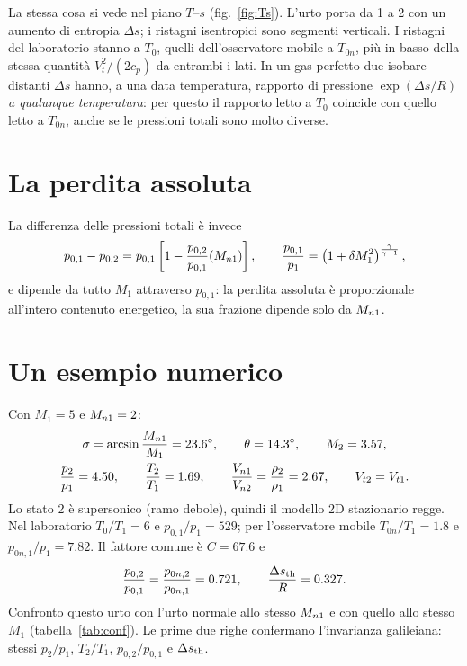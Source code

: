 La stessa cosa si vede nel piano $T$--$s$ (fig.~\ref{fig:Ts}). L'urto porta da 1 a 2 con un aumento di entropia
$\Delta s$; i ristagni isentropici sono segmenti verticali. I ristagni del laboratorio stanno a $T_0$, quelli
dell'osservatore mobile a $T_{0n}$, più in basso della stessa quantità $V_t^2/(2c_p)$ da entrambi i lati. In un gas
perfetto due isobare distanti $\Delta s$ hanno, a una data temperatura, rapporto di pressione $\exp(\Delta s/R)$
\emph{a qualunque temperatura}: per questo il rapporto letto a $T_0$ coincide con quello letto a $T_{0n}$, anche se
le pressioni totali sono molto diverse.


\section*{La perdita assoluta}
La differenza delle pressioni totali è invece
\begin{gather*}
  p_{0,1}-p_{0,2}=p_{0,1}\left[1-\frac{p_{0,2}}{p_{0,1}}(M_{n1})\right] ,\qquad
  \frac{p_{0,1}}{p_1}=\left(1+\delta M_1^2\right)^{\frac{\gamma}{\gamma-1}},
\end{gather*}
e dipende da tutto $M_1$ attraverso $p_{0,1}$: la perdita assoluta è proporzionale all'intero contenuto energetico,
la sua frazione dipende solo da $M_{n1}$.

\section*{Un esempio numerico}
Con $M_1=5$ e $M_{n1}=2$:
\begin{gather*}
  \sigma=\arcsin\frac{M_{n1}}{M_1}=\ang{23.6} ,\qquad \theta=\ang{14.3} ,\qquad M_2=\num{3.57},\\
  \frac{p_2}{p_1}=\num{4.50} ,\qquad \frac{T_2}{T_1}=\num{1.69} ,\qquad
  \frac{V_{n1}}{V_{n2}}=\frac{\rho_2}{\rho_1}=\num{2.67} ,\qquad V_{t2}=V_{t1}.
\end{gather*}
Lo stato 2 è supersonico (ramo debole), quindi il modello 2D stazionario regge. Nel laboratorio $T_0/T_1=6$ e
$p_{0,1}/p_1=529$; per l'osservatore mobile $T_{0n}/T_1=\num{1.8}$ e $p_{0n,1}/p_1=\num{7.82}$. Il fattore comune è
$C=\num{67.6}$ e
\begin{gather*}
  \frac{p_{0,2}}{p_{0,1}}=\frac{p_{0n,2}}{p_{0n,1}}=\num{0.721} ,\qquad \frac{\Delta s_{\rm th}}{R}=\num{0.327}.
\end{gather*}
Confronto questo urto con l'urto normale allo stesso $M_{n1}$ e con quello allo stesso $M_1$
(tabella~\ref{tab:conf}). Le prime due righe confermano l'invarianza galileiana: stessi $p_2/p_1$, $T_2/T_1$,
$p_{0,2}/p_{0,1}$ e $\Delta s_{\rm th}$.

